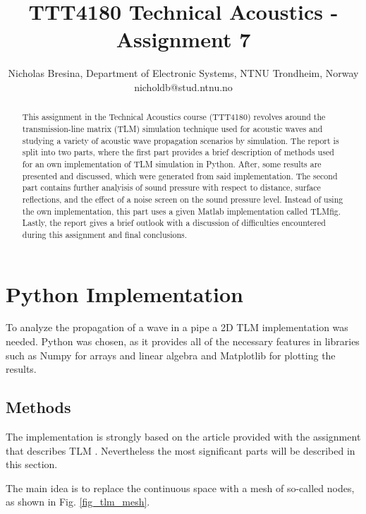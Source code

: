 \documentclass[twocolumn]{article}
\begin{document}
\title{TTT4180 Technical Acoustics - Assignment 7}

\author{Nicholas Bresina, Department of Electronic Systems, NTNU Trondheim, Norway \\
nicholdb@stud.ntnu.no}

\maketitle\thispagestyle{empty}

\begin{abstract}
This assignment in the Technical Acoustics course (TTT4180) revolves around
the transmission-line matrix (TLM) simulation technique used for acoustic waves
and studying a variety of acoustic wave propagation scenarios by simulation.
The report is split into two parts, where the first part provides a brief
description of methods used for an own implementation of TLM simulation in Python.
After, some results are presented and discussed, which were generated from said
implementation.
The second part contains further analyisis of sound pressure
with respect to distance, surface reflections, and the effect of a noise screen
on the sound pressure level.
Instead of using the own implementation, this part uses a given Matlab implementation
called TLMfig.
Lastly, the report gives a brief outlook with a discussion of difficulties
encountered during this assignment and final conclusions.
\end{abstract}


\section{Python Implementation}
To analyze the propagation of a wave in a pipe a 2D TLM implementation was needed.
Python was chosen, as it provides all of the necessary features in libraries such
as Numpy for arrays and linear algebra and Matplotlib for plotting the results.

\subsection{Methods}
The implementation is strongly based on the article provided with the assignment
that describes TLM \cite{KagawaTLM}.
Nevertheless the most significant parts will be described in this section.

The main idea is to replace the continuous space with a mesh of so-called nodes,
as shown in Fig. \ref{fig_tlm_mesh}.
\end{document}
